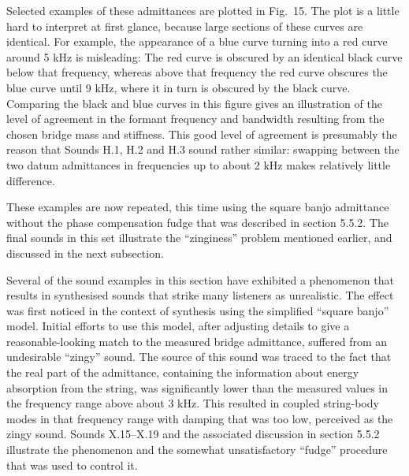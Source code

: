   Selected examples of these admittances are plotted in Fig.\ 15. The plot is 
  a little hard to interpret at first glance, because large sections of these 
  curves are identical. For example, the appearance of a blue curve turning 
  into a red curve around 5 kHz is misleading: The red curve is obscured by an 
  identical black curve below that frequency, whereas above that frequency the 
  red curve obscures the blue curve until 9 kHz, where it in turn is obscured 
  by the black curve. Comparing the black and blue curves in this figure gives 
  an illustration of the level of agreement in the formant frequency and 
  bandwidth resulting from the chosen bridge mass and stiffness. This good 
  level of agreement is presumably the reason that Sounds H.1, H.2 and H.3 
  sound rather similar: swapping between the two datum admittances in 
  frequencies up to about 2 kHz makes relatively little difference. 


  These examples are now repeated, this time using the square banjo admittance 
  without the phase compensation fudge that was described in section 5.5.2. The 
  final sounds in this set illustrate the ``zinginess'' problem mentioned 
  earlier, and discussed in the next subsection. 


  Several of the sound examples in this section have exhibited a phenomenon 
  that results in synthesised sounds that strike many listeners as unrealistic. 
  The effect was first noticed in the context of synthesis using the simplified 
  ``square banjo'' model. Initial efforts to use this model, after adjusting 
  details to give a reasonable-looking match to the measured bridge admittance, 
  suffered from an undesirable ``zingy'' sound. The source of this sound was 
  traced to the fact that the real part of the admittance, containing the 
  information about energy absorption from the string, was significantly lower 
  than the measured values in the frequency range above about 3 kHz. This 
  resulted in coupled string-body modes in that frequency range with damping 
  that was too low, perceived as the zingy sound. Sounds X.15--X.19 and the 
  associated discussion in section 5.5.2 illustrate the phenomenon and the 
  somewhat unsatisfactory ``fudge'' procedure that was used to control it. 

